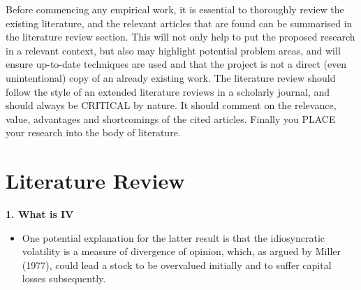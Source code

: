 Before commencing any empirical work, it is essential to thoroughly review the existing literature, and the relevant articles that are found can be summarised in the literature review section. This will not only help to put the proposed research in a relevant context, but also may highlight potential problem areas, and will ensure up-to-date techniques are used and that the project is not a direct (even unintentional) copy of an already existing work. The literature review should follow the style of an extended literature reviews in a scholarly journal, and should always be CRITICAL by nature. It should comment on the relevance, value, advantages and shortcomings of the cited articles. Finally you PLACE your research into the body of literature.


\chapter{Literature Review}

\textbf{1. What is IV}
\begin{itemize}
    \item One potential explanation for the latter result is that the idiosyncratic volatility is a measure of divergence of opinion, which, as argued by Miller (1977), could lead a stock to be overvalued initially and to suffer capital losses subsequently.
\end{itemize}

